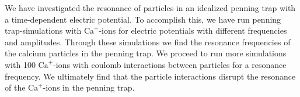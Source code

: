\label{section:abstract}
We have investigated the resonance of particles in an idealized penning trap with a time-dependent electric potential. To accomplish this, we have run penning trap-simulations with $\text{Ca}^{+}$-ions for electric potentials with different frequencies and amplitudes. Through these simulations we find the resonance frequencies of the calcium particles in the penning trap. We proceed to run more simulations with 100 $\text{Ca}^{+}$-ions with coulomb interactions between particles for a resonance frequency. We ultimately find that the particle interactions disrupt the resonance of the $\text{Ca}^{+}$-ions in the penning trap.
